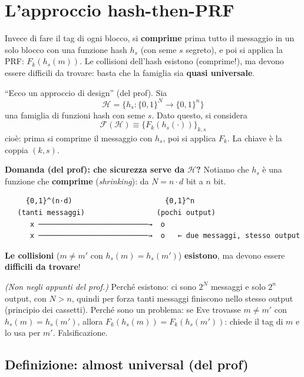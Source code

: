 \section{L'approccio hash-then-PRF}

\begin{inbreve}
Invece di fare il tag di ogni blocco, si \textbf{comprime} prima tutto il messaggio in un solo blocco con una funzione hash \(h_s\) (con seme \(s\) segreto), e poi si applica la PRF: \(F_k(h_s(m))\). Le collisioni dell'hash esistono (comprime!), ma devono essere difficili da trovare: basta che la famiglia sia \textbf{quasi universale}.
\end{inbreve}

``Ecco un approccio di design'' (del prof). Sia
\[
\mathcal{H} = \{h_s : \{0,1\}^N \to \{0,1\}^n\}
\]
una famiglia di funzioni hash con seme \(s\). Dato questo, si considera
\[
\mathcal{F}(\mathcal{H}) \equiv \{F_k(h_s(\cdot))\}_{k, s}
\]
cioè: prima si comprime il messaggio con \(h_s\), poi si applica \(F_k\). La chiave è la coppia \((k, s)\).

\textbf{Domanda (del prof): che sicurezza serve da \(\mathcal{H}\)?} Notiamo che \(h_s\) è una funzione che \textbf{comprime} (\emph{shrinking}): da \(N = n \cdot d\) bit a \(n\) bit.

\begin{verbatim}
     {0,1}^(n·d)                      {0,1}^n
   (tanti messaggi)                 (pochi output)
      x ──────────────────────────→  o
      x ──────────────────────────→  o   ← due messaggi, stesso output
\end{verbatim}

\textbf{Le collisioni} (\(m \ne m'\) con \(h_s(m) = h_s(m')\)) \textbf{esistono}, ma devono essere \textbf{difficili da trovare}!

\begin{nota}
\emph{(Non negli appunti del prof.)} Perché esistono: ci sono \(2^N\) messaggi e solo \(2^n\) output, con \(N > n\), quindi per forza tanti messaggi finiscono nello stesso output (principio dei cassetti). Perché sono un problema: se Eve trovasse \(m \ne m'\) con \(h_s(m) = h_s(m')\), allora \(F_k(h_s(m)) = F_k(h_s(m'))\): chiede il tag di \(m\) e lo usa per \(m'\). Falsificazione.
\end{nota}

\subsection{Definizione: almost universal (del prof)}

